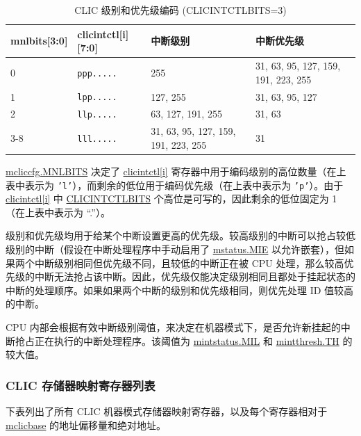 \documentclass[main\_\_CN.tex]{subfiles}
\begin{document}
\begin{longtable}{ | l | l | l | l | }
\caption{CLIC 级别和优先级编码 (CLICINTCTLBITS=3)}
\label{tab:riscv-clic-level-priority}
\\\hline
\rowcolor{lightgray}
mnlbits[3:0] & clicintctl[i][7:0] & 中断级别 & 中断优先级 \\ \hline
0   & \texttt{ppp.....} & 255 & 31, 63, 95, 127, 159, 191, 223, 255 \\ \hline
1   & \texttt{lpp.....} & 127, 255 & 31, 63, 95, 127 \\ \hline
2   & \texttt{llp.....} & 63, 127, 191, 255 & 31, 63 \\ \hline
3-8 & \texttt{lll.....} & 31, 63, 95, 127, 159, 191, 223, 255 & 31 \\ \hline
\end{longtable}

\hyperref[fielddesc:MCLICCFG_MNLBITS]{mcliccfg.MNLBITS} 决定了 \hyperref[regdesc:MCLICINTCTL_REG_i]{clicintctl[i]} 寄存器中用于编码级别的高位数量（在上表中表示为 \texttt{'l'}），而剩余的低位用于编码优先级（在上表中表示为 \texttt{'p'}）。由于 \hyperref[regdesc:MCLICINTCTL_REG_i]{clicintctl[i]} 中 \hyperref[fielddesc:CLICINFO_CLICINTCTLBITS]{CLICINTCTLBITS} 个高位是可写的，因此剩余的低位固定为 1（在上表中表示为 ``.”）。

级别和优先级均用于给某个中断设置更高的优先级。较高级别的中断可以抢占较低级别的中断（假设在中断处理程序中手动启用了 \hyperref[fielddesc:MSTATUSMIE]{mstatus.MIE} 以允许嵌套），但如果两个中断级别相同但优先级不同，且较低的中断正在被 CPU 处理，那么较高优先级的中断无法抢占该中断。因此，优先级仅能决定级别相同且都处于挂起状态的中断的处理顺序。如果如果两个中断的级别和优先级相同，则优先处理 ID 值较高的中断。


CPU 内部会根据有效中断级别阈值，来决定在机器模式下，是否允许新挂起的中断抢占正在执行的中断处理程序。该阈值为 \hyperref[fielddesc:MINTSTATUS_MIL]{{mintstatus.MIL}} 和 \hyperref[fielddesc:MINTTHRESH_TH]{{mintthresh.TH}} 的较大值。


\hypertarget{riscvcpu-clic-memmap-reg-summ}{}
\subsubsection{CLIC 存储器映射寄存器列表}
\label{sec:riscvcpu-clic-memmap-reg-summ}

下表列出了所有 CLIC 机器模式存储器映射寄存器，以及每个寄存器相对于 \hyperref[fielddesc:MCLICBASE]{mclicbase} 的地址偏移量和绝对地址。
\end{document}
